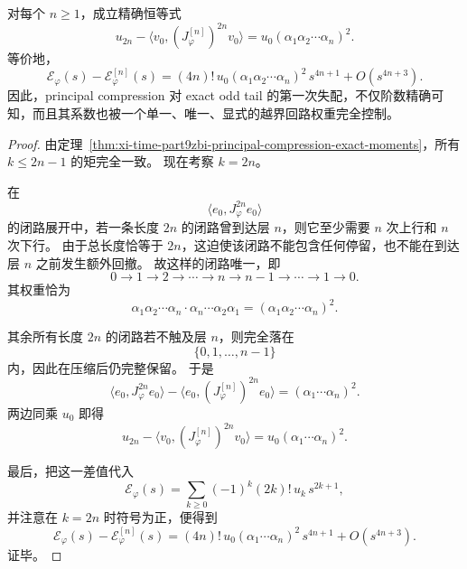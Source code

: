 \begin{theorem}[唯一越界回路给出的首个失配项精确公式]\label{thm:xi-time-part9zbi-first-mismatch-unique-excursion}
对每个 \(n\ge 1\)，成立精确恒等式
\[
u_{2n}-\langle v_0,(J_\varphi^{[n]})^{2n}v_0\rangle
=
u_0(\alpha_1\alpha_2\cdots \alpha_n)^2.
\]
等价地，
\[
\mathcal E_\varphi(s)-\mathcal E_\varphi^{[n]}(s)
=
(4n)!\,u_0(\alpha_1\alpha_2\cdots \alpha_n)^2\,s^{4n+1}
+O(s^{4n+3}).
\]
因此，principal compression 对 exact odd tail 的第一次失配，不仅阶数精确可知，而且其系数也被一个单一、唯一、显式的越界回路权重完全控制。
\end{theorem}
\begin{proof}
由定理~\ref{thm:xi-time-part9zbi-principal-compression-exact-moments}，所有 \(k\le 2n-1\) 的矩完全一致。
现在考察 \(k=2n\)。

在
\[
\langle e_0,J_\varphi^{2n}e_0\rangle
\]
的闭路展开中，若一条长度 \(2n\) 的闭路曾到达层 \(n\)，则它至少需要 \(n\) 次上行和 \(n\) 次下行。
由于总长度恰等于 \(2n\)，这迫使该闭路不能包含任何停留，也不能在到达层 \(n\) 之前发生额外回撤。
故这样的闭路唯一，即
\[
0\to 1\to 2\to \cdots\to n\to n-1\to \cdots\to 1\to 0.
\]
其权重恰为
\[
\alpha_1\alpha_2\cdots\alpha_n\cdot \alpha_n\cdots\alpha_2\alpha_1
=
(\alpha_1\alpha_2\cdots\alpha_n)^2.
\]

其余所有长度 \(2n\) 的闭路若不触及层 \(n\)，则完全落在
\[
\{0,1,\dots,n-1\}
\]
内，因此在压缩后仍完整保留。
于是
\[
\langle e_0,J_\varphi^{2n}e_0\rangle
-
\langle e_0,(J_\varphi^{[n]})^{2n}e_0\rangle
=
(\alpha_1\cdots\alpha_n)^2.
\]
两边同乘 \(u_0\) 即得
\[
u_{2n}-\langle v_0,(J_\varphi^{[n]})^{2n}v_0\rangle
=
u_0(\alpha_1\cdots\alpha_n)^2.
\]

最后，把这一差值代入
\[
\mathcal E_\varphi(s)
=
\sum_{k\ge 0}(-1)^k(2k)!\,u_k\,s^{2k+1},
\]
并注意在 \(k=2n\) 时符号为正，便得到
\[
\mathcal E_\varphi(s)-\mathcal E_\varphi^{[n]}(s)
=
(4n)!\,u_0(\alpha_1\cdots\alpha_n)^2\,s^{4n+1}
+O(s^{4n+3}).
\]
证毕。
\end{proof}

